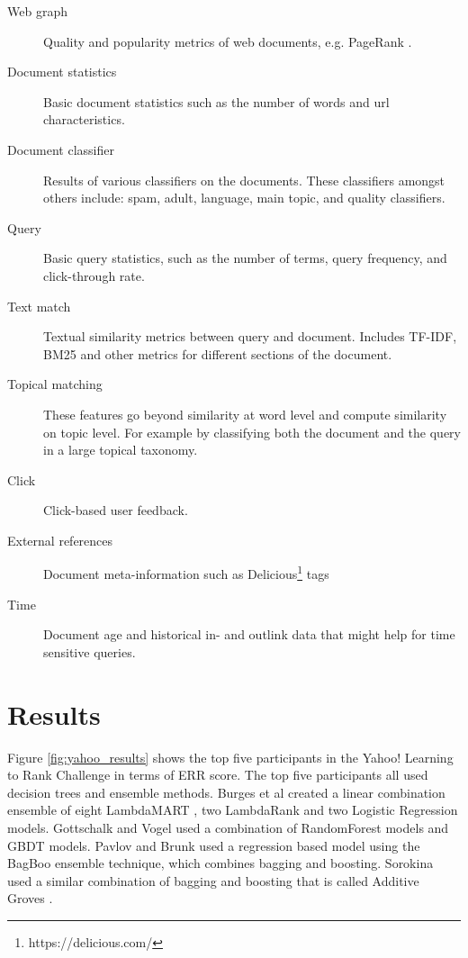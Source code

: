 \begin{description}
\item[Web graph]{Quality and popularity metrics of web documents, e.g. PageRank \cite{Page1999}}.
\item[Document statistics]{Basic document statistics such as the number of words and url characteristics.}
\item[Document classifier]{Results of various classifiers on the documents. These classifiers amongst others include: spam, adult, language, main topic, and quality classifiers.}
\item[Query]{Basic query statistics, such as the number of terms, query frequency, and click-through rate.}
\item[Text match]{Textual similarity metrics between query and document. Includes \ac{TF-IDF}, BM25 \cite{Robertson2009} and other metrics for different sections of the document.}
\item[Topical matching]{These features go beyond similarity at word level and compute similarity on topic level. For example by classifying both the document and the query in a large topical taxonomy.}
\item[Click]{Click-based user feedback.}
\item[External references]{Document meta-information such as Delicious\footnote{https://delicious.com/} tags}
\item[Time]{Document age and historical in- and outlink data that might help for time sensitive queries.}
\end{description}

\section{Results}
Figure \ref{fig:yahoo_results} shows the top five participants in the Yahoo! Learning to Rank Challenge in terms of ERR score. The top five participants all used decision trees and ensemble methods. Burges et al \cite{Burges2011} created a linear combination ensemble of eight LambdaMART \cite{Burges2010}, two LambdaRank and two Logistic Regression models. Gottschalk and Vogel used a combination of RandomForest models and \ac{GBDT} models. Pavlov and Brunk used a regression based model using the BagBoo \cite{Pavlov2010} ensemble technique, which combines bagging and boosting. Sorokina used a similar combination of bagging and boosting that is called Additive Groves \cite{Sorokina2007}.\\

